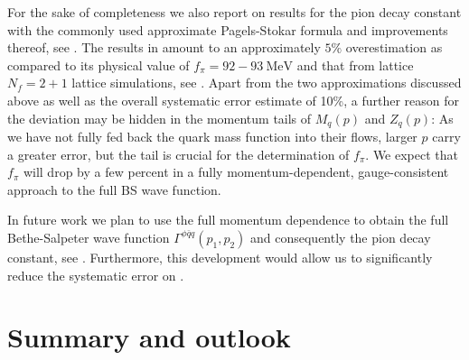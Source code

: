 \documentclass[aps,twocolumn,prd,superscriptaddress]{revtex4-2}
\begin{document}
For the sake of completeness we also report on results for the pion decay constant with the commonly used approximate Pagels-Stokar formula and improvements thereof, see . The results in  amount to an approximately $5\%$ overestimation as compared to its physical value of $f_\pi = 92-\qty{93}{\MeV}$ and that from lattice $N_f = 2+1$ lattice simulations, see \cite{Workman:2022ynf}. Apart from the two approximations discussed above as well as the overall systematic error estimate of 10\%, a further reason for the deviation may be hidden in the momentum tails of $M_q(p)$ and $Z_q(p)$: As we have not fully fed back the quark mass function into their flows, larger $p$ carry a greater error, but the tail is crucial for the determination of $f_\pi$. 
We expect that $f_\pi$ will drop by a few percent in a fully momentum-dependent, gauge-consistent approach to the full BS wave function. 

In future work we plan to use the full momentum dependence to obtain the full Bethe-Salpeter wave function $\Gamma^{\phi\bar qq}(p_1,p_2)$ and consequently the pion decay constant, see \cite{Eichmann:2016yit}. Furthermore, this development would allow us to significantly reduce the systematic error on .


\section{Summary and outlook}
\label{sec:outlookQCD}
\end{document}

